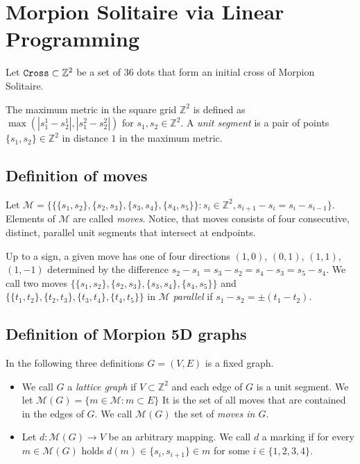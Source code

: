 \section{Morpion Solitaire via Linear Programming}
\label{sec:linear}

  Let $\texttt{Cross} \subset \mathbb{Z}^2$ be a set of $36$ dots that form an initial cross of Morpion Solitaire.
\begin{definition}
The maximum metric in the square grid $\mathbb{Z}^2$ is defined as $\max (|s_1^1-s_2^1|,|s_1^2-s_2^2|)$
for $s_1,s_2\in \mathbb{Z}^2$. 
A \emph{unit segment} is a pair of points $\{s_1,s_2\}\in \mathbb{Z}^2$ in distance $1$ in the maximum metric. %
\end{definition}


\subsection{Definition of moves}
Let 
    $
      \mathcal{M} = \{ \{ \{s_1, s_2\}, \{s_2, s_3\}, \{s_3, s_4\}, \{s_4, s_5\} \} \colon s_i \in \mathbb{Z}^2, s_{i+1} - s_i = s_i - s_{i-1} \}.
    $
    Elements of $\mathcal{M}$ are called \emph{moves}. 
Notice, that moves consists of four consecutive, distinct, parallel unit segments that intersect at endpoints. 

Up to a sign, a given move has one of four directions $(1,0)$, $(0,1)$, $(1,1)$, $(1,-1)$ determined by
the difference $s_{2} - s_1 = s_3 - s_2 = s_4 - s_3 = s_5 - s_4$. 
We call two moves $\{ \{s_1, s_2\}, \{s_2, s_3\}, \{s_3, s_4\}, \{s_4, s_5\} \}$ and $\{ \{t_1, t_2\}, \{t_2, t_3\}, \{t_3, t_4\}, \{t_4, t_5\} \}$ 
in $\mathcal{M}$ {\em parallel} if $s_1-s_2 = \pm (t_1-t_2)$.  

\subsection{Definition of Morpion 5D graphs}
In the following 
three definitions  $G = (V, E)$ is a fixed graph. 
\begin{definition} 
\begin{itemize}
\item We call $G$  a \emph{lattice graph} if $V \subset \mathbb{Z}^2$
      and each edge of $G$ is a unit segment.
    We let
    $
      \mathcal{M}(G) = \{ m \in \mathcal{M} \colon m \subset E \}
    $
    It is the set of all moves that are contained in the edges of $G$. We call $\mathcal{M}(G)$ the set of \emph{moves in $G$}.
\item Let $d \colon \mathcal{M}(G) \to V$ be an arbitrary mapping. We call $d$ a marking if for every $m\in \mathcal{M}(G)$ holds
      $
      	d(m) \in \{s_i, s_{i+1}\} \in m
      $
    for some $i\in \{1,2,3,4\}$.
\end{itemize}
\end{definition}

